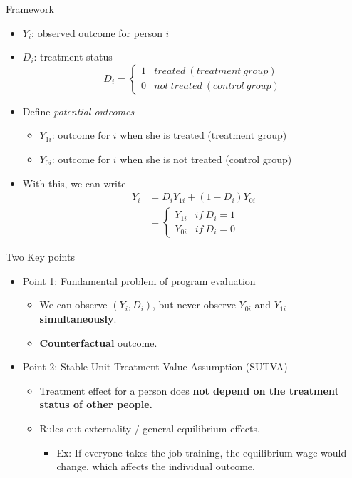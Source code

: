 \documentclass[
  ignorenonframetext,
]{beamer}
\providecommand{\tightlist}{%
  \setlength{\itemsep}{0pt}\setlength{\parskip}{0pt}}
\begin{document}
\begin{frame}{Framework}
\protect\hypertarget{framework-1}{}
\begin{itemize}
\item
  \(Y_{i}\): observed outcome for person \(i\)
\item
  \(D_{i}\): treatment status \[D_{i}=\begin{cases}
  1 & treated\ (treatment\ group)\\
  0 & not\ treated\ (control\ group)
  \end{cases}\]
\item
  Define \emph{potential outcomes}

  \begin{itemize}
  \item
    \(Y_{1i}\): outcome for \(i\) when she is treated (treatment group)
  \item
    \(Y_{0i}\): outcome for \(i\) when she is not treated (control
    group)
  \end{itemize}
\item
  With this, we can write \[\begin{aligned}
  Y_{i} & =D_{i}Y_{1i}+(1-D_{i})Y_{0i}\\
   & =\begin{cases}
  Y_{1i} & if\ D_{i}=1\\
  Y_{0i} & if\ D_{i}=0
  \end{cases}\end{aligned}\]
\end{itemize}
\end{frame}

\begin{frame}{Two Key points}
\protect\hypertarget{two-key-points}{}
\begin{itemize}
\item
  Point 1: Fundamental problem of program evaluation

  \begin{itemize}
  \item
    We can observe \((Y_{i},D_{i})\), but never observe \(Y_{0i}\) and
    \(Y_{1i}\) \textbf{simultaneously}.
  \item
    \textbf{Counterfactual} outcome.
  \end{itemize}
\item
  Point 2: Stable Unit Treatment Value Assumption (SUTVA)

  \begin{itemize}
  \item
    Treatment effect for a person does \textbf{not depend on the
    treatment status of other people.}
  \item
    Rules out externality / general equilibrium effects.

    \begin{itemize}
    \tightlist
    \item
      Ex: If everyone takes the job training, the equilibrium wage would
      change, which affects the individual outcome.
    \end{itemize}
  \end{itemize}
\end{itemize}
\end{frame}
\end{document}

